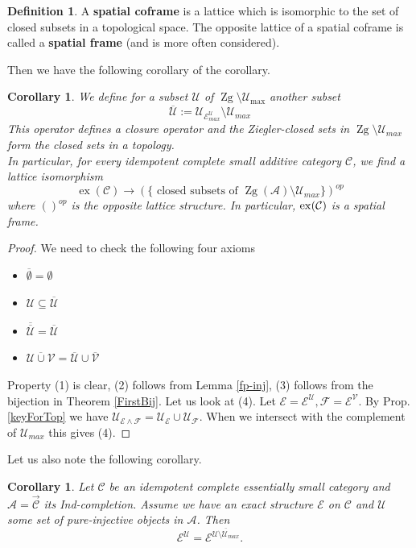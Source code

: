 \documentclass[11pt,a4paper]{amsart}
\theoremstyle{plain}
\newtheorem{cor}[thm]{Corollary}
\theoremstyle{definition}
\newtheorem{dfn}[thm]{Definition}
\newcommand{\mcA}{\mathcal{A}}
\newcommand{\mcC}{\mathcal{C}}
\newcommand{\mcE}{\mathcal{E}}
\newcommand{\mcF}{\mathcal{F}}
\newcommand{\mcU}{\mathcal{U}}
\newcommand{\mcV}{\mathcal{V}}
\DeclareMathOperator{\exact}{ex}
\DeclareMathOperator{\Zg}{Zg}
\begin{document}
\begin{dfn}
A \textbf{spatial coframe} is a lattice which is isomorphic to the set of closed subsets in a topological space. The opposite lattice of a spatial coframe is called a \textbf{spatial frame} (and is more often considered).      
\end{dfn}

Then we have the following corollary of the corollary. 
\begin{cor}
We define for a subset $\mcU$ of $\Zg\setminus \mcU_{\max}$ another subset  
\[
\overline{\mcU}:=\mcU_{\mcE_{max}^{\mcU}}\setminus \mcU_{max}
\]
This operator defines a closure operator and the Ziegler-closed sets in $\Zg\setminus \mcU_{max}$ form the closed sets in a topology. \\
In particular, for every idempotent complete small additive category $\mcC$, we find a lattice isomorphism 
\[
\exact (\mcC) \to (\{ \text{ closed subsets of } \Zg(\mcA) \setminus \mcU_{max}\})^{op}
\]
where $()^{op}$ is the opposite lattice structure. 
In particular, ${\rm ex} (\mcC)$ is a spatial frame.    
\end{cor}

\begin{proof}
We need to check the following four axioms 
\begin{itemize}
\item[(1)] $\overline{\emptyset}=\emptyset$
\item[(2)] $\mcU \subseteq \overline{\mcU}$
\item[(3)] $\overline{\overline{\mcU}}=\overline{\mcU}$
\item[(4)] $\overline{\mcU \cup \mcV}=\overline{\mcU}\cup \overline{\mcV}$
\end{itemize}
Property (1) is clear, (2) follows from Lemma \ref{fp-inj}, (3) follows from the bijection in Theorem \ref{FirstBij}. 
Let us look at (4). Let $\mcE=\mcE^{\mcU}, \mcF=\mcE^{\mcV}$. By Prop. \ref{keyForTop} we have 
$\mcU_{\mcE\wedge \mcF} =\mcU_{\mcE} \cup \mcU_{\mcF}$. 
When we intersect with the complement of $\mcU_{max}$ this gives (4). 
\end{proof}



Let us also note the following corollary.
\begin{cor} Let $\mcC$ be an idempotent complete essentially small category and $\mcA=\overrightarrow{\mcC}$ its Ind-completion. Assume we have an exact structure $\mcE$ on $\mcC$ and $\mcU$ some set of pure-injective objects in $\mcA$. 
Then \[
\mcE^{\mcU} = \mcE^{\overline{\mcU\setminus \mcU_{max}}}. 
\] 
\end{cor}
\end{document}
